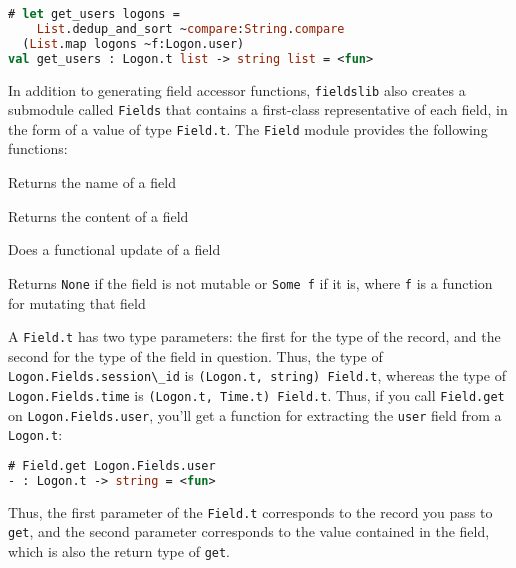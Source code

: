 \begin{lstlisting}[language=Caml]
# let get_users logons =
    List.dedup_and_sort ~compare:String.compare
  (List.map logons ~f:Logon.user)
val get_users : Logon.t list -> string list = <fun>
\end{lstlisting}

In addition to generating field accessor functions,
\passthrough{\lstinline!fieldslib!} also creates a submodule called
\passthrough{\lstinline!Fields!} that contains a first-class
representative of each field, in the form of a value of type
\passthrough{\lstinline!Field.t!}. The \passthrough{\lstinline!Field!}
module provides the following functions:

\begin{description}
\tightlist
\item[\texttt{Field.name}]
Returns the name of a field
\item[\texttt{Field.get}]
Returns the content of a field
\item[\texttt{Field.fset}]
Does a functional update of a field
\item[\texttt{Field.setter}]
Returns \passthrough{\lstinline!None!} if the field is not mutable or
\passthrough{\lstinline!Some f!} if it is, where
\passthrough{\lstinline!f!} is a function for mutating that field
\end{description}

A \passthrough{\lstinline!Field.t!} has two type parameters: the first
for the type of the record, and the second for the type of the field in
question. Thus, the type of
\passthrough{\lstinline!Logon.Fields.session\_id!} is
\passthrough{\lstinline!(Logon.t, string) Field.t!}, whereas the type of
\passthrough{\lstinline!Logon.Fields.time!} is
\passthrough{\lstinline!(Logon.t, Time.t) Field.t!}. Thus, if you call
\passthrough{\lstinline!Field.get!} on
\passthrough{\lstinline!Logon.Fields.user!}, you'll get a function for
extracting the \passthrough{\lstinline!user!} field from a
\passthrough{\lstinline!Logon.t!}:

\begin{lstlisting}[language=Caml]
# Field.get Logon.Fields.user
- : Logon.t -> string = <fun>
\end{lstlisting}

Thus, the first parameter of the \passthrough{\lstinline!Field.t!}
corresponds to the record you pass to \passthrough{\lstinline!get!}, and
the second parameter corresponds to the value contained in the field,
which is also the return type of \passthrough{\lstinline!get!}.

